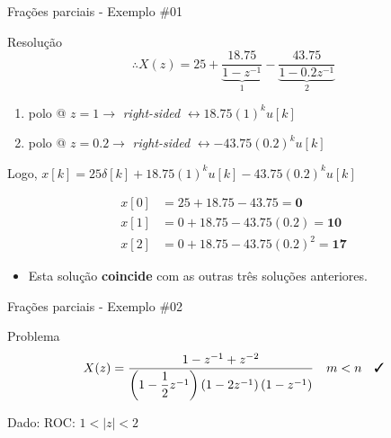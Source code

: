 \begin{frame}{Frações parciais - Exemplo \#01}
\begin{block}{Resolução}
		\[ \therefore X(z)=25+\underbrace{\dfrac{\num{18.75}}{1-z^{-1}}}_{1}-\underbrace{\dfrac{\num{43.75}}{1-\num{0.2}z^{-1}}}_{2} \]
		
		\begin{enumerate}
			\item polo @ $ z=1 \rightarrow $ \textit{right-sided} $ \leftrightarrow \num{18.75}(1)^{k}u[k] $
			\item polo @ $ z=\num{0.2} \rightarrow $ \textit{right-sided} $ \leftrightarrow -\num{43.75}(\num{0.2})^{k}u[k] $
		\end{enumerate}

Logo, $ x[k]=25\delta[k]+\num{18.75}(1)^{k}u[k]-\num{43.75}(\num{0.2})^{k}u[k] $

	\begin{align*}
	x[0] &= 25 + \num{18.75} -\num{43.75} = \bm{0} \\
	x[1] &= 0 + \num{18.75} -\num{43.75}(\num{0.2}) = \bm{10} \\
    x[2] &= 0 + \num{18.75} -\num{43.75} (\num{0.2})^2 = \bm{17} 
    \end{align*}
    
\begin{itemize}
    \item Esta solução \textbf{coincide} com as outras três soluções anteriores.
\end{itemize}
\end{block}
\end{frame}

































\begin{frame}{Frações parciais - Exemplo \#02}
\begin{block}{Problema}
	\[ X(z)=\dfrac{1-z^{-1}+z^{-2}}{
		\left( 1-\dfrac{1}{2}z^{-1} \right)
		\left( 1-2z^{-1} \right)
		\left( 1-z^{-1} \right) } \quad m<n \quad \text{\cmark} \]
	
	Dado: ROC: $ 1<|z|<2 $
\end{block}
\end{frame}


